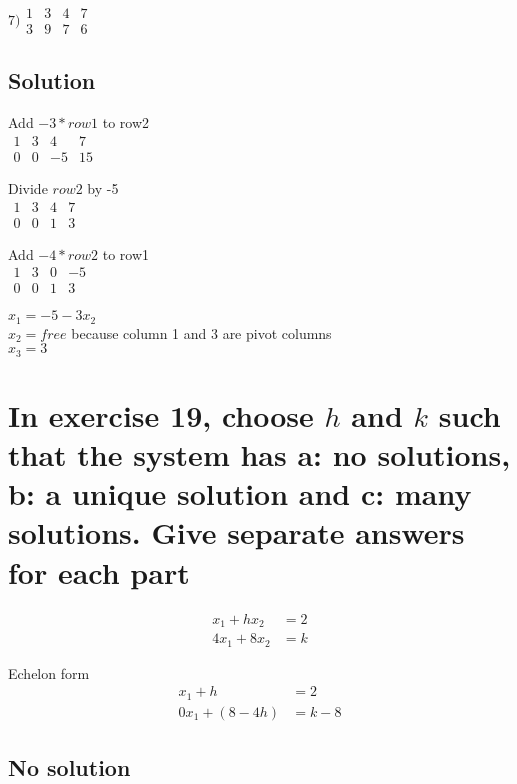 \documentclass{article}
\begin{document}
$7)
\begin{matrix}
1 & 3 & 4 & 7\\
3 & 9 & 7 & 6
\end{matrix}
$

\subsection{Solution}

Add $-3*row1$ to row2\\
$
\begin{matrix}
1 & 3 & 4 & 7\\
0 & 0 & -5 & 15
\end{matrix}
$

Divide $row2$ by -5\\
$
\begin{matrix}
1 & 3 & 4 & 7\\
0 & 0 & 1 & 3
\end{matrix}
$

Add $-4*row2$ to row1\\
$
\begin{matrix}
1 & 3 & 0 & -5\\
0 & 0 & 1 & 3
\end{matrix}
$

$x_{1} = -5 - 3x_{2}$\\
$x_{2} = free$ because column 1 and 3 are pivot columns\\
$x_{3} = 3$

\section{In exercise 19, choose $h$ and $k$ such that the system has a: no solutions, b: a unique solution and c: many solutions. Give separate answers for each part}

\begin{align*}
x_{1} + hx_{2} &= 2\\
4x_{1} + 8x_{2} &= k 
\end{align*}

Echelon form\\
\begin{align*}
x_{1} + h & = 2\\
0x_{1} + (8-4h) & = k-8
\end{align*}

\subsection{No solution}
\end{document}
